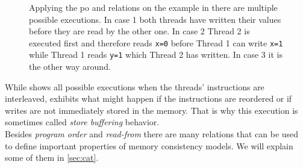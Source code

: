 \documentclass[a4paper,twoside,12pt, english]{article}
\begin{document}
\begin{figure}[h]
\begin{minipage}[c]{0.33\textwidth}
\end{minipage}
\caption{Applying the po and \rf{} relations on the example in  there are multiple possible executions. In case 1 both threads have written their values before they are read by the other one. In case 2 Thread 2 is executed first and therefore reads \texttt{x=0} before Thread 1 can write \texttt{x=1} while Thread 1 reads \texttt{y=1} which Thread 2 has written. In case 3 it is the other way around.}
\label{fig:examplegraph}
\end{figure}

\pagebreak

While  shows all possible executions when the threads' instructions are interleaved,  exhibits what might happen if the instructions are reordered or if writes are not immediately stored in the memory. That is why this execution is sometimes called \textit{store buffering} behavior. \\
Besides \textit{program order} and \textit{read-from} there are many relations that can be used to define important properties of memory consistency models. We will explain some of them in \cref{sec:cat}.
\end{document}
